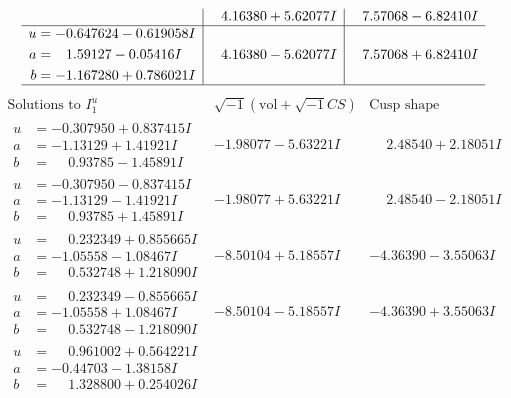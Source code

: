 \documentclass[1p]{elsarticle_modified}
\theoremstyle{definition}
\newcommand{\I}{\sqrt{-1}}
\begin{document}
$$\begin{array}{c|c|c}
 & \phantom{-}4.16380 + 5.62077 I & \phantom{-}7.57068 - 6.82410 I \\ \hline\begin{aligned}
u &= -0.647624 - 0.619058 I \\
a &= \phantom{-}1.59127 - 0.05416 I \\
b &= -1.167280 + 0.786021 I\end{aligned}
 & \phantom{-}4.16380 - 5.62077 I & \phantom{-}7.57068 + 6.82410 I\\
 \hline 
 \end{array}$$\newpage$$\begin{array}{c|c|c}  
\text{Solutions to }I^u_{1}& \I (\text{vol} + \sqrt{-1}CS) & \text{Cusp shape}\\
 \hline 
\begin{aligned}
u &= -0.307950 + 0.837415 I \\
a &= -1.13129 + 1.41921 I \\
b &= \phantom{-}0.93785 - 1.45891 I\end{aligned}
 & -1.98077 - 5.63221 I & \phantom{-}2.48540 + 2.18051 I \\ \hline\begin{aligned}
u &= -0.307950 - 0.837415 I \\
a &= -1.13129 - 1.41921 I \\
b &= \phantom{-}0.93785 + 1.45891 I\end{aligned}
 & -1.98077 + 5.63221 I & \phantom{-}2.48540 - 2.18051 I \\ \hline\begin{aligned}
u &= \phantom{-}0.232349 + 0.855665 I \\
a &= -1.05558 - 1.08467 I \\
b &= \phantom{-}0.532748 + 1.218090 I\end{aligned}
 & -8.50104 + 5.18557 I & -4.36390 - 3.55063 I \\ \hline\begin{aligned}
u &= \phantom{-}0.232349 - 0.855665 I \\
a &= -1.05558 + 1.08467 I \\
b &= \phantom{-}0.532748 - 1.218090 I\end{aligned}
 & -8.50104 - 5.18557 I & -4.36390 + 3.55063 I \\ \hline\begin{aligned}
u &= \phantom{-}0.961002 + 0.564221 I \\
a &= -0.44703 - 1.38158 I \\
b &= \phantom{-}1.328800 + 0.254026 I\end{aligned}

\end{array}$$
\end{document}
